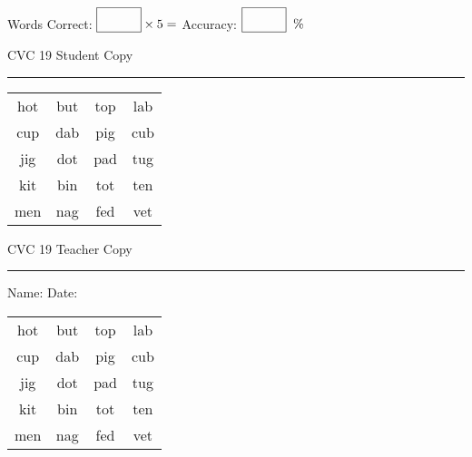\documentclass{memoir}
\begin{document}
\small

Words Correct: $\fbox{\phantom{\huge 100}} \times 5 = $ Accuracy: $\fbox{\phantom{\huge 100}}\;\; \%$ 

\vfill

\newpage


\footnotesize \noindent
CVC 19 \hfill Student Copy
\smallskip
\hrule

\Large

\setlength{\tabcolsep}{14pt}
\def\arraystretch{2}

{\selectfont


\begin{vplace}[0.5]
\begin{center}
\begin{tabular}{cccc}
hot & but & top & lab \\
cup & dab & pig & cub \\
jig & dot & pad & tug \\
kit & bin & tot & ten \\
men & nag & fed & vet \\
\end{tabular}
\end{center}
\end{vplace}

}

\newpage

\footnotesize \noindent
CVC 19 \hfill Teacher Copy
\smallskip
\hrule

\small

\vfill

\noindent
Name: \underline{\hspace{1.75in}} \hfill Date: \underline{\hspace{1in}}

\Large

{\selectfont


\begin{vplace}[0.5]
\begin{center}
\begin{tabular}{cccc}
hot & but & top & lab \\
cup & dab & pig & cub \\
jig & dot & pad & tug \\
kit & bin & tot & ten \\
men & nag & fed & vet \\
\end{tabular}
\end{center}
\end{vplace}



}
\end{document}
